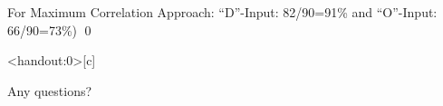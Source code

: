\documentclass[
        ]{beamer}
\begin{document}
        \begin{frame}[c]{\subsecname}
            \begin{overprint}
            	\onslide<2> For Maximum Correlation Approach: ``D''-Input: 82/90=91\% and ``O''-Input: 66/90=73\%) \qed
            \end{overprint}   
        \end{frame}

        
    \begin{frame}<handout:0>[c]{\secname}
        \centerline{\Large{Any questions?}}
    \end{frame}
    
    
    
\end{document}
